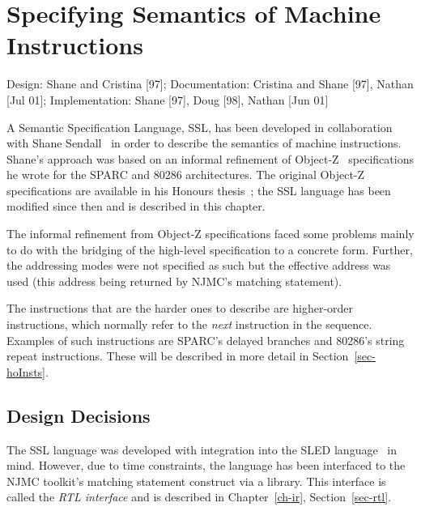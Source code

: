 
\chapter{Specifying Semantics of Machine Instructions}
\label{ch-ssl}

{\small
\begin{flushright}
Design: Shane and Cristina [97]; Documentation: Cristina and Shane [97], 
	Nathan [Jul 01]; Implementation: Shane [97], Doug [98], Nathan [Jun 01]
\end{flushright} 
}

A Semantic Specification Language, SSL, has been developed in
collaboration with Shane Sendall~\cite{Send97} in order to describe the
semantics of machine instructions.  
Shane's approach was based on an informal refinement of Object-Z~\cite{Duke97} 
specifications he wrote for the SPARC and 80286 architectures.
The original Object-Z specifications are available in his Honours 
thesis~\cite{Send97}; the SSL language has been modified since then and 
is described in this chapter.

The informal refinement from Object-Z specifications faced some
problems mainly to do with the bridging of the high-level specification
to a concrete form.  Further, the addressing modes were not
specified as such but the effective address was used (this address
being returned by NJMC's matching statement).  

The instructions that are the harder ones to describe are higher-order
instructions, which normally refer to the \emph{next} instruction 
in the sequence.  Examples of such instructions are SPARC's delayed
branches and 80286's string repeat instructions.  These will be 
described in more detail in Section~\ref{sec-hoInsts}.


\section{Design Decisions}
The SSL language was developed with integration into the SLED 
language~\cite{Rams97,Rams95} in mind.  However, due to 
time constraints, the language has been interfaced to the NJMC
toolkit's matching statement construct via a library.  This interface is 
called the \emph{RTL interface} and is described in Chapter~\ref{ch-ir},
Section~\ref{sec-rtl}. 

